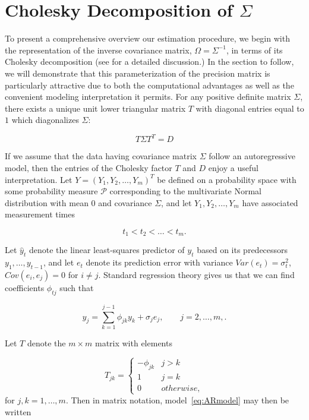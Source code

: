 \documentclass[12pt]{article}
\theoremstyle{definition}
\begin{document}
\section{Cholesky Decomposition of $\Sigma$}

To present a comprehensive overview our estimation procedure, we begin with the representation of the inverse covariance matrix, $\Omega = \Sigma^{-1}$, in terms of its Cholesky decomposition (see \citet{pourahmadi2007cholesky} for a detailed discussion.) In the section to follow, we will demonstrate that this parameterization of the precision matrix is particularly attractive due to both the computational advantages as well as the convenient modeling interpretation it permits. For any positive definite matrix $\Sigma$, there exists a unique unit lower triangular matrix $T$ with diagonal entries equal to $1$ which diagonalizes $\Sigma$:

\begin{equation}
\nonumber T \Sigma T^T = D
\end{equation}
\noindent

If we assume that the data having covariance matrix $\Sigma$ follow an autoregressive model, then the entries of the Cholesky factor $T$ and $D$ enjoy a useful interpretation. Let $Y = \left( Y_{1}, Y_{2}, \dots, Y_{m} \right)^T$ be defined on a probability space with some probability measure $\mathcal{P}$ corresponding to the multivariate Normal distribution with mean $0$ and covariance $\Sigma$, and let $Y_1,Y_2,\dots, Y_m$ have associated measurement times 

\[
t_{1} < t_{2} < \dots< t_{m}.
\]


Let $\hat{y}_t$ denote the linear least-squares predictor of $y_t$ based on its predecessors $y_1,\dots, y_{t-1}$, and let $e_t$ denote its prediction error with variance $Var\left(e_t\right)=\sigma_t^2$, $Cov\left(e_i,e_j\right)=0$ for $i \ne j$. Standard regression theory gives us that we can find coefficients $\phi_{tj}$ such that

\begin{equation}
{y}_{j}  = \sum_{k=1}^{j-1} \phi_{jk} y_{k} + \sigma_{j}e_{j}, \qquad j=2,\dots,m, \label{eq:ARmodel}.
\end{equation}

 Let $T$ denote the $m \times m$  matrix with elements 

\[
T_{jk} = \left\{
\begin{array}{ll}
-\phi_{jk} & j > k\\
1 & j = k \\
0 & otherwise,
\end{array}\right.
\]
\noindent
for $j,k=1,\dots,m$. Then in matrix notation,  model~\ref{eq:ARmodel} may then be written
\end{document}
